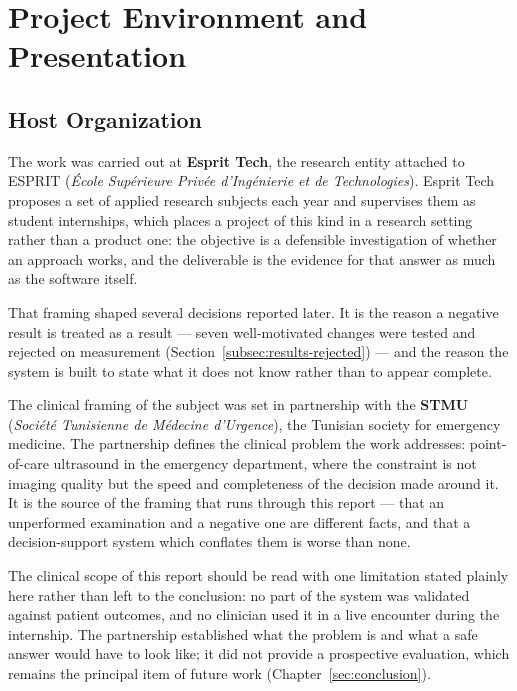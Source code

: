 \section{Project Environment and Presentation}
\label{sec:environment}

\subsection{Host Organization}
\label{subsec:host}

The work was carried out at \textbf{Esprit Tech}, the research entity attached to ESPRIT
(\textit{École Supérieure Privée d'Ingénierie et de Technologies}). Esprit Tech proposes a
set of applied research subjects each year and supervises them as student internships,
which places a project of this kind in a research setting rather than a product one: the
objective is a defensible investigation of whether an approach works, and the deliverable is
the evidence for that answer as much as the software itself.

That framing shaped several decisions reported later. It is the reason a negative result is
treated as a result --- seven well-motivated changes were tested and rejected on measurement
(Section~\ref{subsec:results-rejected}) --- and the reason the system is built to state what
it does not know rather than to appear complete.

The clinical framing of the subject was set in partnership with the \textbf{STMU}
(\textit{Société Tunisienne de Médecine d'Urgence}), the Tunisian society for emergency
medicine. The partnership defines the clinical problem the work addresses: point-of-care
ultrasound in the emergency department, where the constraint is not imaging quality but the
speed and completeness of the decision made around it. It is the source of the framing that
runs through this report --- that an unperformed examination and a negative one are different
facts, and that a decision-support system which conflates them is worse than none.

The clinical scope of this report should be read with one limitation stated plainly here
rather than left to the conclusion: no part of the system was validated against patient
outcomes, and no clinician used it in a live encounter during the internship. The partnership
established what the problem is and what a safe answer would have to look like; it did not
provide a prospective evaluation, which remains the principal item of future work
(Chapter~\ref{sec:conclusion}).

